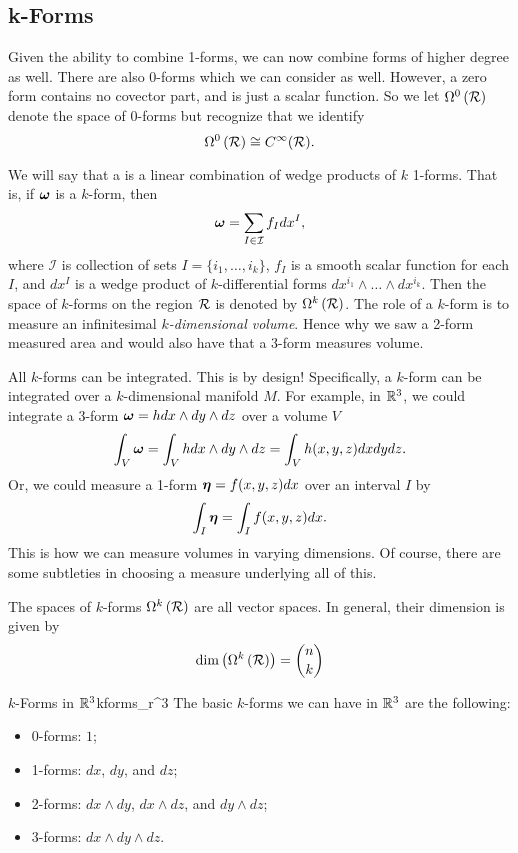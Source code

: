 \subsection{k-Forms}

Given the ability to combine 1-forms, we can now combine forms of higher degree as well.  There are also 0-forms which we can consider as well.  However, a zero form contains no covector part, and is just a scalar function. So we let $\Omega^0\left(\mathcal{R}\right)$ denote the space of 0-forms but recognize that we identify
\[
\Omega^0\left(\mathcal{R}\right) \cong C^\infty(\mathcal{R}).
\]

We will say that a  is a linear combination of wedge products of $k$ 1-forms.  That is, if $\boldsymbol{\omega}$ is a $k$-form, then
\[
\boldsymbol{\omega} = \sum_{I\in \mathcal{I}} f_I dx^{I},
\]
where $\mathcal{I}$ is collection of sets $I=\{i_1,\dots,i_k\}$, $f_I$ is a smooth scalar function for each $I$, and $dx^I$ is a wedge product of $k$-differential forms $dx^{i_1}\wedge \dots \wedge dx^{i_k}$. Then the space of $k$-forms on the region $\mathcal{R}$ is denoted by $\Omega^k\left(\mathcal{R}\right)$.  The role of a $k$-form is to measure an infinitesimal \emph{$k$-dimensional volume}.  Hence why we saw a 2-form measured area and would also have that a 3-form measures volume.

All $k$-forms can be integrated.  This is by design! Specifically, a $k$-form can be integrated over a $k$-dimensional manifold $M$.  For example, in $\mathbb{R}^3$, we could integrate a 3-form $\boldsymbol{\omega} = hdx\wedge dy \wedge dz$ over a volume $V$
\[
\int_V \boldsymbol{\omega} = \int_V hdx\wedge dy \wedge dz = \int_V h(x,y,z)dxdydz.
\]
Or, we could measure a 1-form $\boldsymbol{\eta}=f(x,y,z)dx$ over an interval $I$ by
\[
\int_I \boldsymbol{\eta} = \int_I f(x,y,z)dx.
\]
This is how we can measure volumes in varying dimensions. Of course, there are some subtleties in choosing a measure underlying all of this.

\begin{remark}
The spaces of $k$-forms $\Omega^k\left(\mathcal{R}\right)$ are all vector spaces.  In general, their dimension is given by
\[
\dim \left( \Omega^k\left(\mathcal{R}\right)\right) = \binom{n}{k}
\]
\end{remark}

\begin{ex}{$k$-Forms in $\mathbb{R}^3$}{kforms_r^3}
The basic $k$-forms we can have in $\mathbb{R}^3$ are the following:
\begin{itemize}
    \item 0-forms: $1$;
    \item 1-forms: $dx$, $dy$, and $dz$;
    \item 2-forms: $dx\wedge dy$, $dx\wedge dz$, and $dy\wedge dz$;
    \item 3-forms: $dx\wedge dy \wedge dz$.
\end{itemize}
\end{ex}


